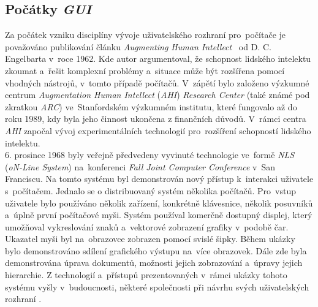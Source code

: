 \documentclass[11pt,twoside,a4paper]{book}
\begin{document}
\subsection{Počátky \textit{GUI}}
Za počátek vzniku disciplíny vývoje uživatelského rozhraní pro~počítače je považováno publikování článku \textit{Augmenting Human Intellect}~\cite{bib:AHI} od D. C. Engelbarta v~roce 1962. Kde autor argumentoval, že schopnost lidského intelektu zkoumat a~řešit komplexní problémy a~situace může být rozšířena pomocí vhodných nástrojů, v~tomto případě počítačů. V~zápětí bylo založeno výzkumné centrum \textit{Augmentation Human Intellect} (\textit{AHI}) \textit{Research Center} (také známé pod zkratkou \textit{ARC}) ve~Stanfordském výzkumném institutu, které fungovalo až do roku 1989, kdy byla jeho činnost ukončena z finančních důvodů. V~rámci centra \textit{AHI} započal vývoj experimentálních technologií pro~rozšíření schopností lidského intelektu.\\
6. prosince 1968 byly veřejně předvedeny vyvinuté technologie ve~formě \textit{NLS} (\textit{oN-Line System}) na~konferenci \textit{Fall Joint Computer Conference} v~San Franciscu. Na tomto systému byl demonstrován nový přístup k~interakci uživatele s~počítačem. Jednalo se o distribuovaný systém několika počítačů. Pro~vstup uživatele bylo používáno několik zařízení, konkrétně klávesnice, několik posuvníků a~úplně první počítačové myši. Systém používal komerčně dostupný displej, který umožňoval vykreslování znaků a~vektorové zobrazení grafiky v~podobě čar. Ukazatel myši byl na~obrazovce zobrazen pomocí svislé šipky. Během ukázky bylo demonstrováno sdílení grafického výstupu na~více obrazovek. Dále zde byla demonstrována úprava dokumentů, možnosti jejich zobrazování a~úpravy jejich hierarchie. Z technologií a~přístupů prezentovaných v~rámci ukázky tohoto systému vyšly v~budoucnosti, některé společnosti při návrhu svých uživatelských rozhraní \cite{bib:aug}.\\
\end{document}
